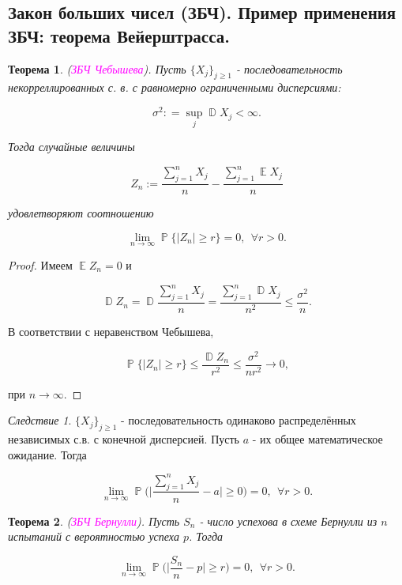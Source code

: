 \documentclass[a4paper,100pt]{article}
\theoremstyle{indented}
\newtheorem{theorem}{Теорема}
\theoremstyle{definition}
\theoremstyle{remark}
\newtheorem{cons}{Следствие}
\DeclareMathOperator{\ra}{\rightarrow}
\DeclareMathOperator{\PP}{\mathbb{P}}
\DeclareMathOperator{\DD}{\mathbb{D}}
\DeclareMathOperator{\EE}{\mathbb{E}}
\begin{document}
\subsection{Закон больших чисел (ЗБЧ). Пример применения ЗБЧ: теорема Вейерштрасса.} 

\begin{theorem}
  (\hypertarget{n21}{\textcolor{magenta}{\textit{ЗБЧ Чебышева}}}). Пусть $\{X_j\}_{j\geq 1}$ - последовательность некорреллированных с. в. с равномерно ограниченными дисперсиями:

  \[
    \sigma^2 : = \sup_j \DD X_j < \infty. 
  \]

  Тогда случайные величины 

  \[
    Z_n:= \frac{\sum_{j=1}^n X_j}{n} - \frac{\sum_{j=1}^n \EE X_j}{n}
  \]

  удовлетворяют соотношению

  \[
    \lim_{n \ra \infty} \PP \{|Z_n|\geq r\} = 0, \: \: \forall r > 0. 
  \]
\end{theorem}

\begin{proof}
  Имеем $\EE Z_n = 0$ и 

  \[
    \DD Z_n = \DD \frac{\sum_{j=1}^n X_j}{n} = \frac{\sum_{j=1}^n \DD X_j}{n^2} \leq \frac{\sigma^2}{n}. 
  \]

  В соответствии с неравенством Чебышева,

  \[
    \PP\{|Z_n|\geq r\} \leq \frac{\DD Z_n}{r^2}\leq \frac{\sigma^2}{nr^2} \ra 0, 
  \]

  при $n \ra \infty$.
\end{proof}

\begin{cons}
  $\{X_j\}_{j\geq 1}$ - последовательность одинаково распределённых независимых с.в. с конечной дисперсией. Пусть $a$ - их общее математическое ожидание. Тогда 

  \[
    \lim_{n \ra \infty} \PP \biggl( \bigg| \frac{\sum_{j=1}^n X_j}{n} - a \bigg| \geq 0 \biggr) = 0, \: \: \forall r > 0. 
  \]

\end{cons}

\begin{theorem}
  (\hypertarget{n22}{\textcolor{magenta}{\textit{ЗБЧ Бернулли}}}). Пусть $S_n$ - число успехова в схеме Бернулли из $n$ испытаний с вероятностью успеха $p$. Тогда 

  \[
    \lim_{n \ra \infty} \PP \biggl( \bigg| \frac{S_n}{n} - p \bigg| \geq r \biggr) = 0, \: \: \forall r >0. 
  \]
\end{theorem}
\end{document}
